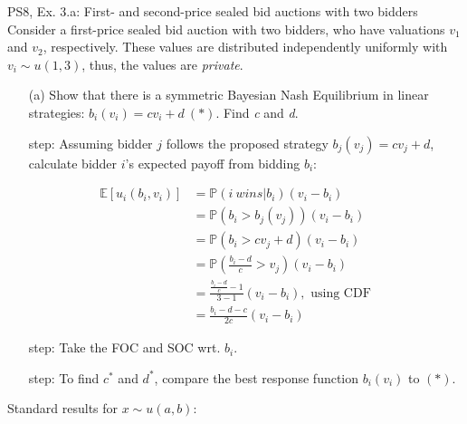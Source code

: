 \begin{frame}{PS8, Ex. 3.a: First- and second-price sealed bid auctions with two bidders}
    Consider a first-price sealed bid auction with two bidders, who have valuations $v_1$ and $v_2$, respectively. These values are distributed independently uniformly with $v_i\sim u(1,3)$, thus, the values are \textit{private}.
    \vspace{-4pt}
    \begin{itemize}
      \item[(a)] Show that there is a symmetric Bayesian Nash Equilibrium in linear strategies: $b_i(v_i) = cv_i + d\ (*)$. Find \textit{c} and \textit{d}.
    \end{itemize}
    \vspace{-8pt}
    \begin{multicols}{2}
      \begin{itemize}
        \item[\nth{1} step:] Assuming bidder $j$ follows the proposed strategy $b_j(v_j) = cv_j + d$, calculate bidder $i$'s expected payoff from bidding $b_i$:
      \end{itemize}
      \vspace{-12pt}
      \begin{align*}
        \mathbb{E}[u_i(b_i,v_i)]&=\mathbb{P}(i\ wins|b_i)(v_i-b_i)\\
                                &=\mathbb{P}(b_i>b_j(v_j))(v_i-b_i)\\
                                &=\mathbb{P}(b_i>cv_j+d)(v_i-b_i)\\
                                &=\mathbb{P}\left(\frac{b_i-d}{c}>v_j\right)(v_i-b_i)\\
                                &=\frac{\frac{b_i-d}{c}-1}{3-1}(v_i-b_i),\text{ using CDF}\\
                                &=\frac{b_i-d-c}{2c}(v_i-b_i)
      \end{align*}
      \vspace{-18pt}
      \begin{itemize}
        \item[\nth{2} step:] Take the FOC and SOC wrt. $b_i$.
        \item[\nth{3} step:] To find $c^*$ and $d^*$, compare the best response function $b_i(v_i)$ to $(*)$.
      \end{itemize}
      \vfill\null\columnbreak
      Standard results for $x\sim u(a, b):$
      \vspace{-6pt}
      \begin{enumerate}

\end{enumerate}
\end{multicols}
\end{frame}
